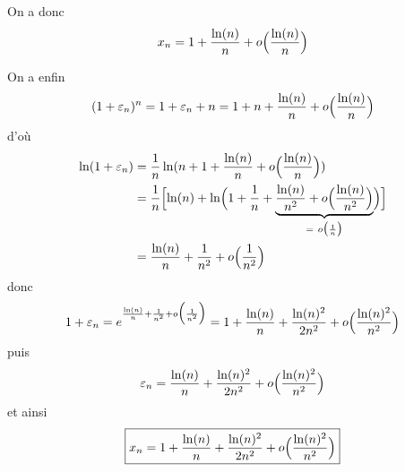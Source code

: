 \begin{solution}
\begin{enumerate}
		On a donc 
		$$x_{n}=1+\frac{\ln(n)}{n}+o\Bigl(\frac{\ln(n)}{n}\Bigr)$$

		On a enfin 
		$$(1+\varepsilon_{n})^{n}=1+\varepsilon_{n}+n=1+n+\frac{\ln(n)}{n}+o\Bigl(\frac{\ln(n)}{n}\Bigr)$$
		d'où
		\begin{align*}
			\ln(1+\varepsilon_{n})
			&=\frac{1}{n}\ln(n+1+\frac{\ln(n)}{n}+o\Bigl(\frac{\ln(n)}{n}\Bigr))\\
			&=\frac{1}{n}\Bigl[\ln(n)+\ln\Bigl(1+\frac{1}{n}+\underbrace{\frac{\ln(n)}{n^{2}}+o\Bigl(\frac{\ln(n)}{n^{2}}\Bigr)}_{=~o\bigl(\frac{1}{n}\bigr)}\Bigr)\Bigr]\\
			&=\frac{\ln(n)}{n}+\frac{1}{n^{2}}+o\Bigl(\frac{1}{n^{2}}\Bigr)
		\end{align*}
		donc 
		$$1+\varepsilon_{n}=e^{\frac{\ln(n)}{n}+\frac{1}{n^{2}}+o\Bigl(\frac{1}{n^{2}}\Bigr)}=1+\frac{\ln(n)}{n}+\frac{\ln(n)^{2}}{2n^{2}}+o\Bigl(\frac{\ln(n)^{2}}{n^{2}}\Bigr)$$
		puis
		$$\varepsilon_{n}=\frac{\ln(n)}{n}+\frac{\ln(n)^{2}}{2n^{2}}+o\Bigl(\frac{\ln(n)^{2}}{n^{2}}\Bigr)$$
		et ainsi
		$$\boxed{x_{n}=1+\frac{\ln(n)}{n}+\frac{\ln(n)^{2}}{2n^{2}}+o\Bigl(\frac{\ln(n)^{2}}{n^{2}}\Bigr)}$$
	\end{enumerate}
\end{solution}


